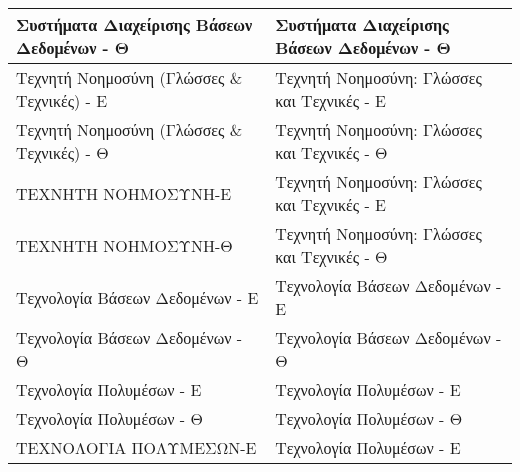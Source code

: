 \documentclass[12pt,a4paper,final]{article}
\begin{document}
\begin{landscape}
\begin{center}
\begin{longtable}{|l|l|}
\hline
Συστήματα Διαχείρισης Βάσεων Δεδομένων - Θ                                                                      & Συστήματα Διαχείρισης Βάσεων Δεδομένων - Θ                                                                           \\ 
\hline
Τεχνητή Νοημοσύνη (Γλώσσες \& Τεχνικές) - Ε                                                                     & Τεχνητή Νοημοσύνη: Γλώσσες και Τεχνικές - Ε                                                                          \\ 
\hline
Τεχνητή Νοημοσύνη (Γλώσσες \& Τεχνικές) - Θ                                                                     & Τεχνητή Νοημοσύνη: Γλώσσες και Τεχνικές - Θ                                                                          \\ 
\hline
ΤΕΧΝΗΤΗ ΝΟΗΜΟΣΥΝΗ-Ε                                                                                             & Τεχνητή Νοημοσύνη: Γλώσσες και Τεχνικές - Ε                                                                          \\ 
\hline
ΤΕΧΝΗΤΗ ΝΟΗΜΟΣΥΝΗ-Θ                                                                                             & Τεχνητή Νοημοσύνη: Γλώσσες και Τεχνικές - Θ                                                                          \\ 
\hline
Τεχνολογία Βάσεων Δεδομένων - Ε                                                                                 & Τεχνολογία Βάσεων Δεδομένων - Ε                                                                                      \\ 
\hline
Τεχνολογία Βάσεων Δεδομένων - Θ                                                                                 & Τεχνολογία Βάσεων Δεδομένων - Θ                                                                                      \\ 
\hline
Τεχνολογία Πολυμέσων - Ε                                                                                        & Τεχνολογία Πολυμέσων - Ε                                                                                             \\ 
\hline
Τεχνολογία Πολυμέσων - Θ                                                                                        & Τεχνολογία Πολυμέσων - Θ                                                                                             \\ 
\hline
ΤΕΧΝΟΛΟΓΙΑ ΠΟΛΥΜΕΣΩΝ-Ε                                                                                          & Τεχνολογία Πολυμέσων - Ε                                                                                             \\ 

\end{longtable}
\end{center}
\end{landscape}
\end{document}
